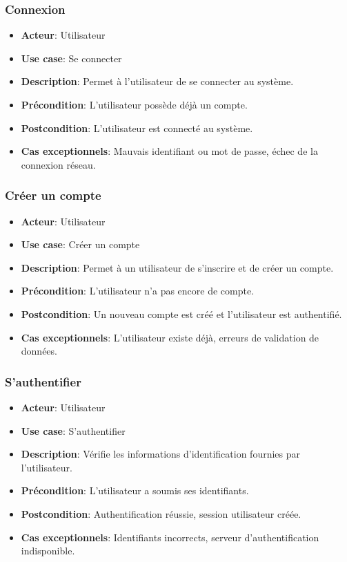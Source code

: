 \documentclass{article}
\begin{document}
\subsubsection*{Connexion}
\begin{itemize}
    \item \textbf{Acteur}: Utilisateur
    \item \textbf{Use case}: Se connecter
    \item \textbf{Description}: Permet à l'utilisateur de se connecter au système.
    \item \textbf{Précondition}: L'utilisateur possède déjà un compte.
    \item \textbf{Postcondition}: L'utilisateur est connecté au système.
    \item \textbf{Cas exceptionnels}: Mauvais identifiant ou mot de passe, échec de la connexion réseau.
\end{itemize}

\subsubsection*{Créer un compte}
\begin{itemize}
    \item \textbf{Acteur}: Utilisateur
    \item \textbf{Use case}: Créer un compte
    \item \textbf{Description}: Permet à un utilisateur de s’inscrire et de créer un compte.
    \item \textbf{Précondition}: L’utilisateur n’a pas encore de compte.
    \item \textbf{Postcondition}: Un nouveau compte est créé et l'utilisateur est authentifié.
    \item \textbf{Cas exceptionnels}: L'utilisateur existe déjà, erreurs de validation de données.
\end{itemize}

\subsubsection*{S'authentifier}
\begin{itemize}
    \item \textbf{Acteur}: Utilisateur
    \item \textbf{Use case}: S'authentifier
    \item \textbf{Description}: Vérifie les informations d'identification fournies par l'utilisateur.
    \item \textbf{Précondition}: L'utilisateur a soumis ses identifiants.
    \item \textbf{Postcondition}: Authentification réussie, session utilisateur créée.
    \item \textbf{Cas exceptionnels}: Identifiants incorrects, serveur d’authentification indisponible.
\end{itemize}
\newpage
\end{document}
